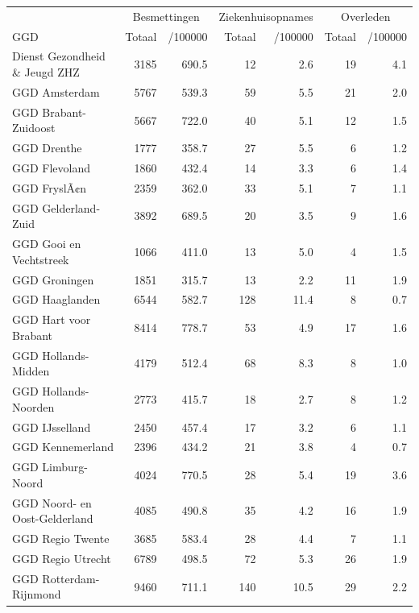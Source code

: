 \documentclass[
  english,
  man,floatsintext]{apa6}
\begin{document}
\begin{table}
\centering\begingroup\fontsize{10}{12}\selectfont

\begin{threeparttable}
\begin{tabular}{lrrrrrr}
\toprule
\multicolumn{1}{c}{ } & \multicolumn{2}{c}{Besmettingen} & \multicolumn{2}{c}{Ziekenhuisopnames} & \multicolumn{2}{c}{Overleden} \\
\cmidrule(l{3pt}r{3pt}){2-3} \cmidrule(l{3pt}r{3pt}){4-5} \cmidrule(l{3pt}r{3pt}){6-7}
GGD & Totaal & /100000 & Totaal & /100000 & Totaal & /100000\\
\midrule
Dienst Gezondheid \& Jeugd ZHZ & 3185 & 690.5 & 12 & 2.6 & 19 & 4.1\\
GGD Amsterdam & 5767 & 539.3 & 59 & 5.5 & 21 & 2.0\\
GGD Brabant-Zuidoost & 5667 & 722.0 & 40 & 5.1 & 12 & 1.5\\
GGD Drenthe & 1777 & 358.7 & 27 & 5.5 & 6 & 1.2\\
GGD Flevoland & 1860 & 432.4 & 14 & 3.3 & 6 & 1.4\\
GGD FryslÃ¢n & 2359 & 362.0 & 33 & 5.1 & 7 & 1.1\\
GGD Gelderland-Zuid & 3892 & 689.5 & 20 & 3.5 & 9 & 1.6\\
GGD Gooi en Vechtstreek & 1066 & 411.0 & 13 & 5.0 & 4 & 1.5\\
GGD Groningen & 1851 & 315.7 & 13 & 2.2 & 11 & 1.9\\
GGD Haaglanden & 6544 & 582.7 & 128 & 11.4 & 8 & 0.7\\
GGD Hart voor Brabant & 8414 & 778.7 & 53 & 4.9 & 17 & 1.6\\
GGD Hollands-Midden & 4179 & 512.4 & 68 & 8.3 & 8 & 1.0\\
GGD Hollands-Noorden & 2773 & 415.7 & 18 & 2.7 & 8 & 1.2\\
GGD IJsselland & 2450 & 457.4 & 17 & 3.2 & 6 & 1.1\\
GGD Kennemerland & 2396 & 434.2 & 21 & 3.8 & 4 & 0.7\\
GGD Limburg-Noord & 4024 & 770.5 & 28 & 5.4 & 19 & 3.6\\
GGD Noord- en Oost-Gelderland & 4085 & 490.8 & 35 & 4.2 & 16 & 1.9\\
GGD Regio Twente & 3685 & 583.4 & 28 & 4.4 & 7 & 1.1\\
GGD Regio Utrecht & 6789 & 498.5 & 72 & 5.3 & 26 & 1.9\\
GGD Rotterdam-Rijnmond & 9460 & 711.1 & 140 & 10.5 & 29 & 2.2\\

\end{tabular}
\end{threeparttable}
\end{table}
\end{document}
